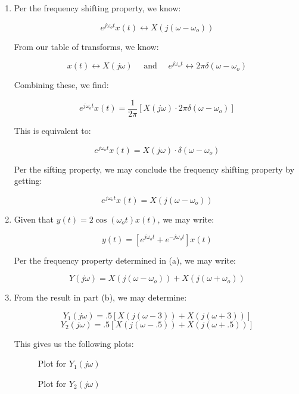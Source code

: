 \begin{enumerate}
    \begin{enumerate}

      \item Per the frequency shifting property, we know:

        $$e^{j\omega_ot}x(t)\longleftrightarrow X(j(\omega-\omega_o))$$

        From our table of transforms, we know:

        $$x(t)\longleftrightarrow X(j\omega)\quad\text{ and }\quad e^{j\omega_ot}\longleftrightarrow 2\pi\delta(\omega-\omega_o)$$

        Combining these, we find:

        $$e^{j\omega_ot}x(t)=\frac{1}{2\pi}\left[ X(j\omega)\cdot2\pi\delta(\omega-\omega_o) \right]$$

        This is equivalent to:

        $$e^{j\omega_ot}x(t)= X(j\omega)\cdot\delta(\omega-\omega_o) $$

        Per the sifting property, we may conclude the frequency shifting property by getting:

      $$\boxed{e^{j\omega_ot}x(t)= X(j(\omega-\omega_o))}$$

    \item Given that $y(t)=2\cos(\omega_ot)x(t)$, we may write:

      $$y(t)=[e^{j\omega_ot}+e^{-j\omega_o t}]x(t)$$

      Per the frequency property determined in (a), we may write:

      $$\boxed{Y(j\omega)=X(j(\omega-\omega_o))+X(j(\omega+\omega_o))}$$

    \item From the result in part (b), we may determine:

      $$Y_1(j\omega)=.5[X(j(\omega-3))+X(j(\omega+3))]$$
      $$Y_2(j\omega)=.5[X(j(\omega-.5))+X(j(\omega+.5))]$$

      This gives us the following plots:

      \begin{figure}[H]
        \centering
        
        \caption{Plot for $Y_1(j\omega)$}
        \label{fig:1}
      \end{figure}

      \begin{figure}[H]
        \centering
        
        \caption{Plot for $Y_2(j\omega)$}
        \label{fig:2}
      \end{figure}


\end{enumerate}
\end{enumerate}
